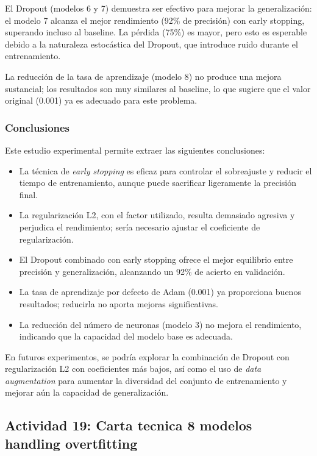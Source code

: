 \documentclass[12pt]{article}
\begin{document}
El Dropout (modelos 6 y 7) demuestra ser efectivo para mejorar la generalización: el modelo 7 alcanza el mejor rendimiento (92\% de precisión) con early stopping, superando incluso al baseline. La pérdida (75\%) es mayor, pero esto es esperable debido a la naturaleza estocástica del Dropout, que introduce ruido durante el entrenamiento.

La reducción de la tasa de aprendizaje (modelo 8) no produce una mejora sustancial; los resultados son muy similares al baseline, lo que sugiere que el valor original (0.001) ya es adecuado para este problema.

\subsubsection*{Conclusiones}

Este estudio experimental permite extraer las siguientes conclusiones:

\begin{itemize}
\item La técnica de \textit{early stopping} es eficaz para controlar el sobreajuste y reducir el tiempo de entrenamiento, aunque puede sacrificar ligeramente la precisión final.
\item La regularización L2, con el factor utilizado, resulta demasiado agresiva y perjudica el rendimiento; sería necesario ajustar el coeficiente de regularización.
\item El Dropout combinado con early stopping ofrece el mejor equilibrio entre precisión y generalización, alcanzando un 92\% de acierto en validación.
\item La tasa de aprendizaje por defecto de Adam (0.001) ya proporciona buenos resultados; reducirla no aporta mejoras significativas.
\item La reducción del número de neuronas (modelo 3) no mejora el rendimiento, indicando que la capacidad del modelo base es adecuada.
\end{itemize}

En futuros experimentos, se podría explorar la combinación de Dropout con regularización L2 con coeficientes más bajos, así como el uso de \textit{data augmentation} para aumentar la diversidad del conjunto de entrenamiento y mejorar aún la capacidad de generalización.

\subsection{Actividad 19: Carta tecnica 8 modelos handling overtfitting}
\end{document}
